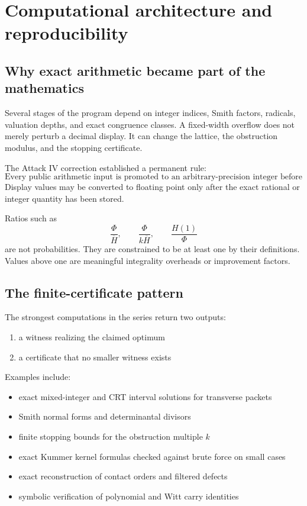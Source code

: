 \chapter{Computational architecture and reproducibility}

\section{Why exact arithmetic became part of the mathematics}
Several stages of the program depend on integer indices, Smith factors, radicals, valuation depths, and exact congruence classes. A fixed-width overflow does not merely perturb a decimal display. It can change the lattice, the obstruction modulus, and the stopping certificate.

The Attack IV correction established a permanent rule:
\[
\boxed{
\text{Every public arithmetic input is promoted to an arbitrary-precision integer before multiplication.}
}
\]
Display values may be converted to floating point only after the exact rational or integer quantity has been stored.

Ratios such as
\[
\frac{\Phi}{\overline H},
\qquad
\frac{\Phi}{k\overline H},
\qquad
\frac{H(1)}{\Phi}
\]
are not probabilities. They are constrained to be at least one by their definitions. Values above one are meaningful integrality overheads or improvement factors.

\section{The finite-certificate pattern}
The strongest computations in the series return two outputs:
\begin{enumerate}[leftmargin=1.5em]
\item a witness realizing the claimed optimum
\item a certificate that no smaller witness exists
\end{enumerate}
Examples include:
\begin{itemize}[leftmargin=1.5em]
\item exact mixed-integer and CRT interval solutions for transverse packets
\item Smith normal forms and determinantal divisors
\item finite stopping bounds for the obstruction multiple $k$
\item exact Kummer kernel formulas checked against brute force on small cases
\item exact reconstruction of contact orders and filtered defects
\item symbolic verification of polynomial and Witt carry identities
\end{itemize}

